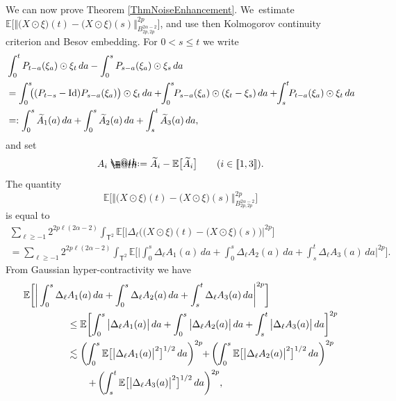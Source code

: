\documentclass[JEP,XML,SOM,Unicode,published]{cedram}
\makeatletter
\theoremstyle{definition}
\newcommand\bbE{\mathbb{E}}
\newcommand*{\defeq}{\mathrel{\rlap{%
\raisebox{0.3ex}{$\m@th\cdot$}}%
\raisebox{-0.3ex}{$\m@th\cdot$}}%
=}
\newcommand{\norme}[1]{\Vert #1 \Vert}
\makeatother
\begin{document}
We can now prove Theorem \ref{ThmNoiseEnhancement}. We~estimate $\bbE\bigl[ \big\Vert\bigl(X\odot\xi\bigr)(t)-\bigl(X\odot\xi\bigr)(s)\big\Vert_{B^{2\alpha-2}_{2p,2p}}^{2p}\bigr]$, and use then Kolmogorov continuity criterion and Besov embedding. For $0<s\leq t$ we write
\begin{align*}
&\int_0^t P_{t-a}(\xi_a)\odot\xi_t \, da - \int_0^s P_{s-a}(\xi_a)\odot \xi_s \, da \\
&= \int_0^s \hspace{-0.1cm} \bigl( (P_{t-s} - \textrm{Id})P_{s-a}(\xi_a) \bigr)\odot\xi_t \,da + \hspace{-0.1cm}\int_0^s \hspace{-0.1cm}P_{s-a}(\xi_a) \odot (\xi_t-\xi_s) \,da + \hspace{-0.1cm}\int_s^t \hspace{-0.1cm}P_{t-a}(\xi_a)\odot\xi_t \,da \\
& =: \int_0^s \widetilde A_1(a)\,da +\int_0^s \widetilde A_2(a)\,da + \int_s^t \widetilde A_3(a)\,da,
\end{align*}
and set
\[
A_i \defeq \widetilde A_i - \bbE\bigl[\widetilde A_i\bigr] \qquad (i\in [\![1,3 ]\!]).
\]
The quantity
\[
\bbE\bigl[\norme{\bigl(X\odot\xi\bigr)(t)-\bigl(X\odot\xi\bigr)(s)}_{B^{2\alpha-2}_{2p,2p}}^{2p}\bigr]
\]
is equal to
\begin{multline*}
\sum_{\ell\geq -1} 2^{2p\ell(2\alpha-2)} \int_{\mathsf{T}^2}\bbE\bigl[ \big|\Delta_\ell \bigl(\bigl(X\odot\xi\bigr)(t)-\bigl(X\odot\xi\bigr)(s)\bigr) \big|^{2p}\bigr] \\
= \sum_{\ell\geq -1} 2^{2p\ell(2\alpha-2)}\int_{\mathsf{T}^2} \bbE\biggl[ \bigg| \int_0^s \Delta_\ell A_1(a)\,da + \int_0^s \Delta_\ell A_2(a)\,da + \int_s^t \Delta_\ell A_3(a)\,da \bigg|^{2p}\biggr].
\end{multline*}
From Gaussian hyper-contractivity we have
\begin{align*}
\bbE\biggl[ \bigg| \int_0^s \Delta_\ell &A_1(a)\,da + \int_0^s \Delta_\ell A_2(a)\,da + \int_s^t \Delta_\ell A_3(a)\,da \bigg|^{2p}\biggr]
\\
&\leq\bbE\biggl[ \int_0^s \big|\Delta_\ell A_1(a)\big|\,da + \int_0^s \big|\Delta_\ell A_2(a)\big|\,da + \int_s^t \big|\Delta_\ell A_3(a)\big|\,da \biggr]^{2p}
\\
&\lesssim \biggl(\hspace{-0.03cm}\int_0^s\bbE\bigl[ \big|\Delta_\ell A_1(a)\big|^2\bigr]^{1/2}\,da\biggr)^{2p} \hspace{-0.1cm}+\hspace{-0.03cm} \biggl(\hspace{-0.03cm}\int_0^s\bbE\bigl[ \big|\Delta_\ell A_2(a)\big|^2\bigr]^{1/2}\,da\biggr)^{2p} \hspace{-0.1cm} \\
&\qquad+\hspace{-0.03cm} \biggl(\hspace{-0.03cm}\int_s^t\bbE\bigl[ \big|\Delta_\ell A_3(a)\big|^2 \bigr]^{1/2}\,da\biggr)^{2p},
\end{align*}
\end{document}

